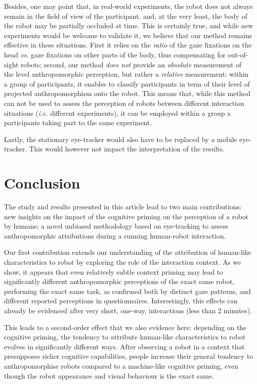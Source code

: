 \documentclass[lettersize, noapacite, twoside, HRI]{apa_HRI}
\newcommand{\ie}{\textit{i.e.}\xspace}
\newcommand{\vs}{\textit{vs.}\xspace}
\begin{document}
Besides, one may point that, in real-world experiments, the robot does not
always remain in the field of view of the participant, and, at the very least, the
body of the robot may be partially occluded at time.  This is certainly true,
and while new experiments would be welcome to validate it, we believe that our
method remains effective in these situations. First it relies on the
\emph{ratio} of the gaze fixations on the head \vs gaze fixations on other parts
of the body, thus compensating for out-of-sight robots; second, our method
\emph{does not} provide an \emph{absolute} measurement of the level
anthropomorphic perception, but rather a \emph{relative} measurement: within a
group of participants, it enables to classify participants in term of their level of
projected anthropomorphism onto the robot.  This means that, while this method
can not be used to assess the perception of robots between different interaction
situations (\ie different experiments), it can be employed within a group a
participants taking part to the same experiment.

Lastly, the stationary eye-tracker would also have to be replaced by a mobile
eye-tracker. This would however not impact the interpretation of the results.

\section{Conclusion}

The study and results presented in this article lead to two main contributions:
new insights on the impact of the cognitive priming on the perception of a robot
by humans; a novel unbiased methodology based on eye-tracking to assess
anthropomorphic attributions during a running human-robot interaction.

Our first contribution extends our understanding of the attribution of
human-like characteristics to robot by exploring the role of the interaction
context. As we show, it appears that even relatively subtle context
priming may lead to significantly different anthropomorphic perceptions of
the exact same robot, performing the exact same task, as confirmed both by
distinct gaze patterns, and different reported perceptions in questionnaires.
Interestingly, this effects can already be evidenced after very short,
one-way, interactions (less than 2 minutes).

This leads to a second-order effect that we also evidence here: depending on the
cognitive priming, the tendency to attribute human-like characteristics to robot
evolves in significantly different ways. After observing a robot in a
context that presupposes richer cognitive capabilities, people increase
their general tendency to anthropomorphise robots compared to a machine-like
cognitive priming, even though the robot appearance and visual behaviour is the
exact same.
\end{document}
